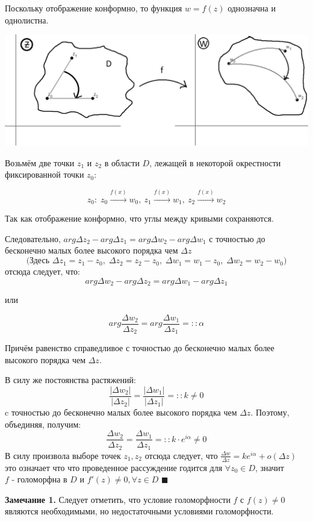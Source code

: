 \documentclass[a4paper, 12pt]{report}
\newenvironment{Proof}
{\par\noindent{\bf Доказательство.}}
{\hfill$\scriptstyle\blacksquare$}
\begin{document}
\begin{Proof}
Поскольку отображение конформно, то функция \(w = f(z)\)  однозначна и однолистна.
\begin{center}
\includegraphics[width=0.5\linewidth]{conform/theorem_figure.png}
\end{center}
Возьмём две точки \(z_1\) и \(z_2\) в области \(D\),  лежащей в некоторой окрестности фиксированной точки \(z_0\):

\[
z_0: \; z_0\xrightarrow{f(x)} w_0, \:z_1\xrightarrow{f(x)} w_1, \: z_2\xrightarrow{f(x)} w_2
\] 

Так как  отображение конформно, что углы между кривыми сохраняются.

Следовательно, \(arg\Delta z_2 - arg\Delta z_1 = arg\Delta w_2 - arg\Delta w_1 \) с точностью до бесконечно малых более высокого порядка чем \(\Delta z\)
\[\text{(Здесь } \Delta z_1 = z_1 - z_0, \;\Delta z_2 = z_2 - z_0, \; \Delta w_1 = w_1 - z_0,\; \Delta w_2 = w_2 - w_0 \text{)}\]
отсюда следует, что:
\[
arg\Delta w_2 - arg\Delta z_2 = arg\Delta w_1 - arg\Delta z_1 
\]
\begin{center}
или  
\end{center}
\[
 arg \frac{\Delta w_2}{\Delta z_2} = arg \frac{\Delta w_1}{\Delta z_1} =:: \alpha
\]

Причём равенство справедливое с точностью до бесконечно малых более высокого порядка чем \(\Delta z\). 

В силу же постоянства растяжений:
\[
\frac{|\Delta w_2|}{|\Delta z_2|} = \frac{|\Delta w_1|}{|\Delta z_1|} =:: k \neq 0
\]
c точностью до бесконечно малых более высокого порядка чем \(\Delta z\).
Поэтому, объединяя, получим:
\[
\frac{\Delta w_2}{\Delta z_2} = \frac{\Delta w_1}{\Delta z_1} =:: k\cdot e^{i\alpha} \neq 0
\]В силу произвола выборе точек \(z_1, z_2\) отсюда следует, что \(\frac{\Delta w}{\Delta z} = ke^{i\alpha} + o(\Delta z)\) это означает что что проведенное рассуждение годится для \(\forall z_0 \in D\), значит \(f \text{ - голоморфна в } D \text{ и } f'(z) \neq 0, \forall z \in D\)
\end{Proof}

\par\bigskip
\textbf{Замечание 1.} \quad Следует отметить, что условие голоморфности \(f\) с \(f(z)\neq 0\)  являются необходимыми, но недостаточными условиями голоморфности.
\end{document}
